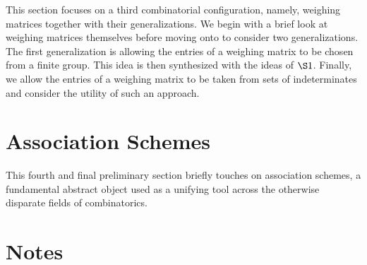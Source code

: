 \documentclass[../../main]{subfiles}
\begin{document}
This section focuses on a third combinatorial configuration, namely, weighing 
matrices together with their generalizations. We begin with a brief look at
weighing matrices themselves before moving onto to consider two generalizations.
The first generalization is allowing the entries of a weighing matrix to be
chosen from a finite group. This idea is then synthesized with the ideas of
$\S1$. Finally, we allow the entries of a weighing matrix to be taken from sets
of indeterminates and consider the utility of such an approach. 

\dinkus



\fancyhf{}

\fancyhead[RO,LE]{\thepage}

\section{Association Schemes}

This fourth and final preliminary section briefly touches on association schemes, a fundamental abstract object used as a unifying tool across the otherwise disparate fields of combinatorics. 

\dinkus



\singlespace

\fancyhf{}

\fancyhead[RO,LE]{\thepage}

\section*{\centering Notes}
\theanotes

\doublespacing

\biblio
\end{document}
